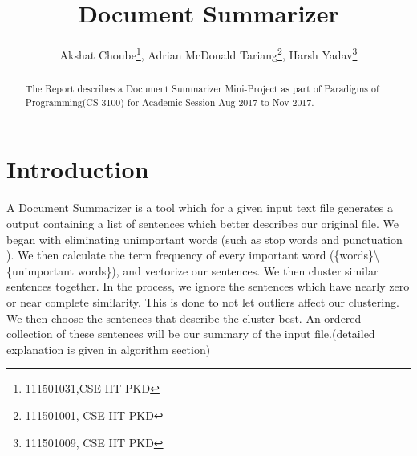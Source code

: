 

\title{Document Summarizer}

\author{Akshat Choube\thanks{111501031,CSE IIT PKD}, Adrian McDonald Tariang\thanks{111501001, CSE IIT PKD},
Harsh Yadav\thanks{111501009, CSE IIT PKD}}
\maketitle
\begin{abstract}
The Report describes a Document Summarizer Mini-Project as part of
Paradigms of Programming(CS 3100) for Academic Session Aug 2017 to
Nov 2017. 
\end{abstract}

\section{Introduction }

A Document Summarizer is a tool which for a given input text file
generates a output containing a list of sentences which better describes
our original file. We began with eliminating unimportant words (such
as stop words and punctuation ). We then calculate the term frequency
of every important word (\{words\}\textbackslash{}\{unimportant words\}),
and vectorize our sentences. We then cluster similar sentences together.
In the process, we ignore the sentences which have nearly zero or
near complete similarity. This is done to not let outliers affect
our clustering. We then choose the sentences that describe the cluster
best. An ordered collection of these sentences will be our summary
of the input file.(detailed explanation is given in algorithm section)

